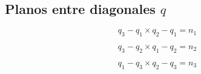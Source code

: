 \documentclass[titlepage, letterpaper, fleqn]{article}
\begin{document}

\subsection{Planos entre diagonales $q$} %
\label{sec:planos_diagonales}

\begin{equation}
    \label{eq:plane_n1}
    q_3 - q_1 \times q_2 - q_1 = n_1 
\end{equation}

\begin{equation}
    \label{eq:plane_n2}
    q_3 - q_2 \times q_1 - q_2 = n_2 
\end{equation}

\begin{equation}
    \label{eq:plane_n3}
    q_1 - q_3 \times q_2 - q_3 = n_3 
\end{equation}





\end{document}
